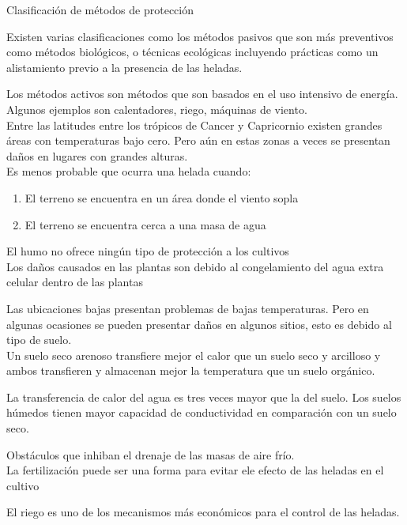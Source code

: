 Clasificación de métodos de protección

Existen varias clasificaciones como los métodos pasivos que son más preventivos como métodos biológicos, o técnicas ecológicas incluyendo prácticas como un alistamiento previo a la presencia de las heladas.

Los métodos activos son métodos que son basados en el uso intensivo de energía. Algunos ejemplos son calentadores, riego, máquinas de viento.\\

Entre las latitudes entre los trópicos de Cancer y Capricornio existen grandes áreas con temperaturas bajo cero. Pero aún en estas zonas a veces se presentan daños en lugares con grandes alturas.\\

Es menos probable que ocurra una helada cuando:
\begin{enumerate}
\item El terreno se encuentra en un área donde el viento sopla
\item El terreno se encuentra cerca a una masa de agua
\end{enumerate}

El humo no ofrece ningún tipo de protección a los cultivos \citep{itier1987influence}\\

Los daños causados en las plantas son debido al congelamiento del agua extra celular dentro de las plantas 

Las ubicaciones bajas presentan problemas de bajas temperaturas. Pero en algunas ocasiones se pueden presentar daños en algunos sitios, esto es debido al tipo de suelo.\\

Un suelo seco arenoso transfiere mejor el calor que un suelo seco y arcilloso y ambos transfieren y almacenan mejor la temperatura que un suelo orgánico.

La transferencia de calor del agua es tres veces mayor que la del suelo. Los suelos húmedos tienen mayor capacidad de conductividad en comparación con un suelo seco.

Obstáculos que inhiban el drenaje de las masas de aire frío.\\

La fertilización puede ser una forma para evitar ele efecto de las heladas en el cultivo

El riego es uno de los mecanismos más económicos para el control de las heladas.\\

